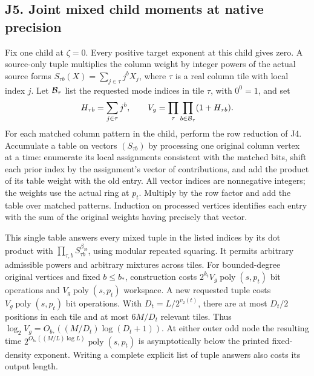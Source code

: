 \documentclass[
  11pt,
]{article}
\begin{document}
\subsection{J5. Joint mixed child moments at native
precision}\label{v9-j5-joint-mixed-child-moments-at-native-precision}

Fix one child at \(\zeta=0\). Every positive target exponent at this
child gives zero. A source-only tuple multiplies the column weight by
integer powers of the actual source forms
\(S_{\tau b}(X)=\sum_{j\in\tau}j^b X_j\), where \(\tau\) is a real
column tile with local index \(j\). Let \({\cal B}_\tau\) list the
requested mode indices in tile \(\tau\), with \(0^0=1\), and set \[
 H_{\tau b}=\sum_{j\in\tau}j^b,\qquad
 V_g=\prod_\tau\prod_{b\in{\cal B}_\tau}(1+H_{\tau b}) .
\] For each matched column pattern in the child, perform the row
reduction of J4. Accumulate a table on vectors \((S_{\tau b})\) by
processing one original column vertex at a time: enumerate its local
assignments consistent with the matched bits, shift each prior index by
the assignment's vector of contributions, and add the product of its
table weight with the old entry. All vector indices are nonnegative
integers; the weights use the actual ring at \(p_t\). Multiply by the
row factor and add the table over matched patterns. Induction on
processed vertices identifies each entry with the sum of the original
weights having precisely that vector.

This single table answers every mixed tuple in the listed indices by its
dot product with \(\prod_{\tau,b}S_{\tau b}^{\beta_{\tau b}}\), using
modular repeated squaring. It permits arbitrary admissible powers and
arbitrary mixtures across tiles. For bounded-degree original vertices
and fixed \(b\le b_*\), construction costs
\(2^{k_t}V_g\operatorname{poly}(s,p_t)\) bit operations and
\(V_g\operatorname{poly}(s,p_t)\) workspace. A new requested tuple costs
\(V_g\operatorname{poly}(s,p_t)\) bit operations. With
\(D_t=L/2^{v_2(t)}\), there are at most \(D_t/2\) positions in each tile
and at most \(6M/D_t\) relevant tiles. Thus
\(\log_2 V_g=O_{b_*}((M/D_t)\log(D_t+1))\). At either outer odd node the
resulting time \(2^{O_{b_*}((M/L)\log L)}\operatorname{poly}(s,p_t)\) is
asymptotically below the printed fixed-density exponent. Writing a
complete explicit list of tuple answers also costs its output length.
\end{document}

